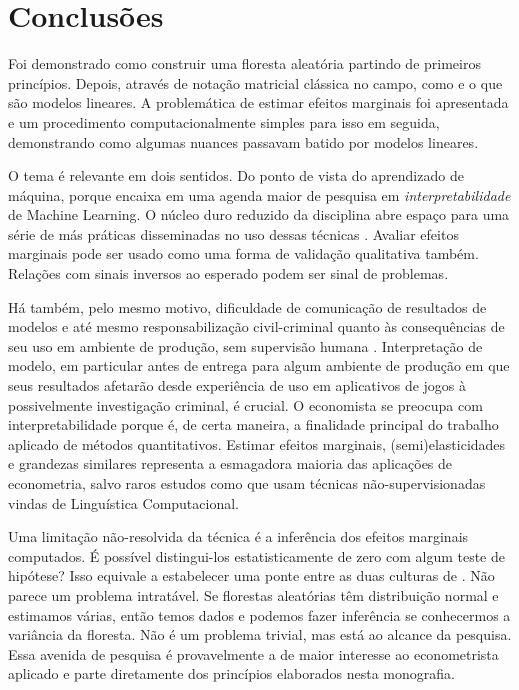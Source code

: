 \chapter{Conclusões}
\label{cap:conclusoes}

Foi demonstrado como construir uma floresta aleatória partindo de primeiros princípios. Depois, através de notação matricial clássica no campo, como e o que são modelos lineares. A problemática de estimar efeitos marginais foi apresentada e um procedimento computacionalmente simples para isso em seguida, demonstrando como algumas nuances passavam batido por modelos lineares.

O tema é relevante em dois sentidos. Do ponto de vista do aprendizado de máquina, porque encaixa em uma agenda maior de pesquisa em \textit{interpretabilidade} de Machine Learning. O núcleo duro reduzido da disciplina abre espaço para uma série de más práticas disseminadas no uso dessas técnicas \cite{flach2019performance}. Avaliar efeitos marginais pode ser usado como uma forma de validação qualitativa também. Relações com sinais inversos ao esperado podem ser sinal de problemas.

Há também, pelo mesmo motivo, dificuldade de comunicação de resultados de modelos e até mesmo responsabilização civil-criminal quanto às consequências de seu uso em ambiente de produção, sem supervisão humana \cite{lepri2018fair}. Interpretação de modelo, em particular antes de entrega para algum ambiente de produção em que seus resultados afetarão desde experiência de uso em aplicativos de jogos à possivelmente investigação criminal, é crucial. O economista se preocupa com interpretabilidade porque é, de certa maneira, a finalidade principal do trabalho aplicado de métodos quantitativos. Estimar efeitos marginais, (semi)elasticidades e grandezas similares representa a esmagadora maioria das aplicações de econometria, salvo raros estudos como  que usam técnicas não-supervisionadas vindas de Linguística Computacional.

Uma limitação não-resolvida da técnica é a inferência dos efeitos marginais computados. É possível distingui-los estatisticamente de zero com algum teste de hipótese? Isso equivale a estabelecer uma ponte entre as duas culturas de . Não parece um problema intratável. Se florestas aleatórias têm distribuição normal e estimamos várias, então temos dados e podemos fazer inferência se conhecermos a variância da floresta. Não é um problema trivial, mas está ao alcance da pesquisa. Essa avenida de pesquisa é provavelmente a de maior interesse ao econometrista aplicado e parte diretamente dos princípios elaborados nesta monografia.




